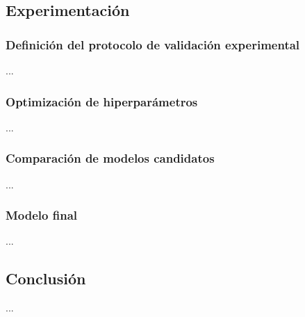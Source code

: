 
\subsection{Experimentación}

\subsubsection{Definición del protocolo de validación experimental}

...


\subsubsection{Optimización de hiperparámetros}

...


\subsubsection{Comparación de modelos candidatos}

... 


\subsubsection{Modelo final}

...


\subsection{Conclusión}

...



